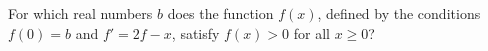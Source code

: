 For which real numbers $b$ does the function $f(x)$, defined by the conditions
$f(0) = b$ and $f' = 2f - x$, satisfy $f(x) > 0$ for all $x \ge 0$?
